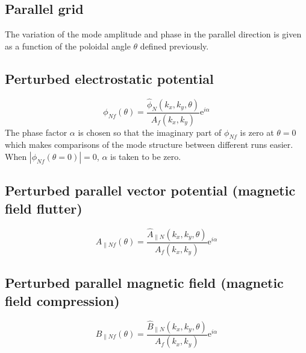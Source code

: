\documentclass[fleqn]{report}
\begin{document}
\subsection{Parallel grid}
The variation of the mode amplitude and phase in the parallel direction is given as a function of the poloidal angle $\theta$ defined previously.
\subsection{Perturbed electrostatic potential}
$$\phi_{Nf}(\theta) = \frac{\hat{\phi}_N(k_x,k_y,\theta)}{A_f(k_x,k_y)}\textrm{e}^{i\alpha}$$
The phase factor $\alpha$ is chosen so that the imaginary part of $\phi_{Nf}$ is zero at $\theta=0$ which makes comparisons of the mode structure between different runs easier.
When $|\phi_{Nf}(\theta=0)|=0$, $\alpha$ is taken to be zero.
 
\subsection{Perturbed parallel vector potential (magnetic field flutter)}
$$A_{\parallel Nf}(\theta) = \frac{\hat{A}_{\parallel N}(k_x,k_y,\theta)}{A_f(k_x,k_y)}\textrm{e}^{i\alpha}$$
\subsection{Perturbed parallel magnetic field (magnetic field compression)}
$$B_{\parallel Nf}(\theta) = \frac{\hat{B}_{\parallel N}(k_x,k_y,\theta)}{A_f(k_x,k_y)}\textrm{e}^{i\alpha}$$
\end{document}
